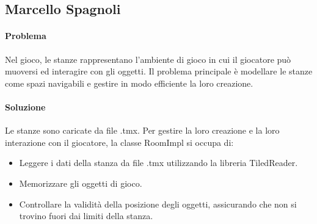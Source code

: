 \documentclass[a4paper,12pt]{report}
\begin{document}
\subsection{Marcello Spagnoli}
%
\paragraph{Problema} %
Nel gioco, le stanze rappresentano l'ambiente di gioco in cui il giocatore può muoversi ed interagire con gli oggetti. Il problema principale è modellare le stanze come spazi navigabili e gestire in modo efficiente la loro creazione.
\paragraph{Soluzione} %
Le stanze sono caricate da file .tmx. Per gestire la loro creazione e la loro interazione con il giocatore, la classe RoomImpl si occupa di:
\begin{itemize}
    \item Leggere i dati della stanza da file .tmx utilizzando la libreria TiledReader.
    \item Memorizzare gli oggetti di gioco.
    \item Controllare la validità della posizione degli oggetti, assicurando che non si trovino fuori dai limiti della stanza.
\end{itemize}
\end{document}
